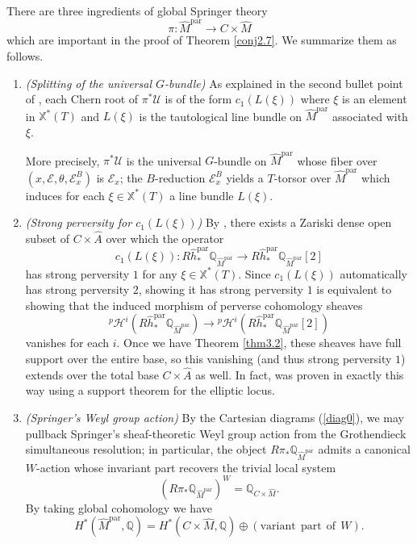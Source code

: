 \documentclass[11pt]{amsart}
\theoremstyle{plain}
\theoremstyle{definition}
\theoremstyle{remark}
\newcommand{\BQ}{{\mathbb{Q}}}
\newcommand{\BX}{{\mathbb{X}}}
\newcommand{\CE}{{\mathcal E}}
\newcommand{\CH}{{\mathcal H}}
\newcommand{\CU}{{\mathcal U}}
\begin{document}
There are three ingredients of global Springer theory
\[
\pi: \widehat{M}^\mathrm{par} \to C \times \widehat{M}
\]
which are important in the proof of Theorem \ref{conj2.7}. We summarize them as follows.
\begin{enumerate}
    \item[(A)] \emph{(Splitting of the universal $G$-bundle)} As explained in the second bullet point of \cite[Construction 6.1.4]{Yun1}, each Chern root of $\pi^*\CU$ is of the form $c_1(L(\xi))$ where $\xi$ is an element in $\BX^*(T)$ and $L(\xi)$ is the tautological line bundle on $\widehat{M}^{\mathrm{par}}$ associated with $\xi$. 
    
    More precisely, $\pi^*\CU$ is the universal $G$-bundle on $\widehat{M}^{\mathrm{par}}$ whose fiber over $(x,\CE,\theta, \CE^B_x)$ is $\CE_x$; the $B$-reduction $\CE_x^B$ yields a $T$-torsor over $\widehat{M}^{\mathrm{par}}$ which induces for each $\xi \in \BX^*(T)$ a line bundle $L(\xi)$.

    
    \item[(B)] \emph{(Strong perversity for $c_1(L(\xi))$)} By \cite[Lemma 3.2.3]{Yun2}, there exists a Zariski dense open subset of $C\times \widehat{A}$ over which the operator
    \[
c_1(L(\xi)): R\widehat{h}^{\mathrm{par}}_*\BQ_{\widehat{M}^{\mathrm{par}}} \to R\widehat{h}^{\mathrm{par}}_*\BQ_{\widehat{M}^{\mathrm{par}}}[2]    \]
has strong perversity $1$ for any $\xi \in \BX^*(T)$. 
Since $c_1(L(\xi))$ automatically has strong perversity $2$, showing it has strong perversity $1$ is equivalent to showing that the induced morphism of perverse cohomology sheaves
\[
{}^{p}\CH^i\left( R\widehat{h}^{\mathrm{par}}_*\BQ_{\widehat{M}^{\mathrm{par}}}\right)\rightarrow
{}^{p}\CH^i\left(R\widehat{h}^{\mathrm{par}}_*\BQ_{\widehat{M}^{\mathrm{par}}}[2]\right)
\]
vanishes for each $i$.  Once we have Theorem \ref{thm3.2}, these sheaves have full support over the entire base, so this vanishing (and thus strong perversity $1$) extends over the total base $C \times \widehat{A}$ as well. 
In fact, \cite[Lemma 3.2.3]{Yun2} was proven in exactly this way using a support theorem \cite[Section 4.6.2]{Yun2} for the elliptic locus.

    
    \item[(C)] \emph{(Springer's Weyl group action)} By the Cartesian diagrams (\ref{diag0}), we may pullback Springer's sheaf-theoretic Weyl group action from the Grothendieck simultaneous resolution; in particular, the object $R\pi_* \BQ_{\widehat{M}^{\mathrm{par}}}$ admits a canonical $W$-action whose invariant part recovers the trivial local system
    \[
\left(R\pi_* \BQ_{\widehat{M}^{\mathrm{par}}} \right)^W = \BQ_{C\times \widehat{M}}.  \]
By taking global cohomology we have
\[
H^*(\widehat{M}^{\mathrm{par}}, \BQ) = H^*(C\times \widehat{M}, \BQ) \oplus \left(\mathrm{variant~~part~~of~~} W \right).
\]
\end{enumerate}
\end{document}
